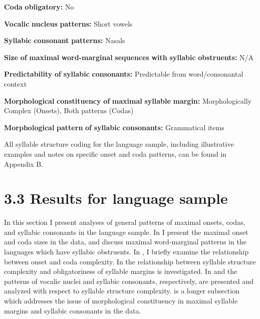 \textbf{Coda} \textbf{obligatory:} No



\textbf{Vocalic} \textbf{nucleus} \textbf{patterns:} Short vowels



\textbf{Syllabic} \textbf{consonant} \textbf{patterns:} Nasals



\textbf{Size} \textbf{of} \textbf{maximal} \textbf{word-marginal} \textbf{sequences} \textbf{with} \textbf{syllabic} \textbf{obstruents:} N/A



\textbf{Predictability} \textbf{of} \textbf{syllabic} \textbf{consonants:} Predictable from word/consonantal context



\textbf{Morphological} \textbf{constituency} \textbf{of} \textbf{maximal} \textbf{syllable} \textbf{margin:} Morphologically Complex (Onsets), Both patterns (Codas)



\textbf{Morphological} \textbf{pattern} \textbf{of} \textbf{syllabic} \textbf{consonants:} Grammatical items

\z


  All syllable structure coding for the language sample, including illustrative examples and notes on specific onset and coda patterns, can be found in Appendix B.


\section{3.3 Results for language sample}

  In this section I present analyses of general patterns of maximal onsets, codas, and syllabic consonants in the language sample. In  I present the maximal onset and coda sizes in the data, and discuss maximal word-marginal patterns in the languages which have syllabic obstruents. In , I briefly examine the relationship between onset and coda complexity. In  the relationship between syllable structure complexity and obligatoriness of syllable margins is investigated. In  and  the patterns of vocalic nuclei and syllabic consonants, respectively, are presented and analyzed with respect to syllable structure complexity.  is a longer subsection which addresses the issue of morphological constituency in maximal syllable margins and syllabic consonants in the data.


